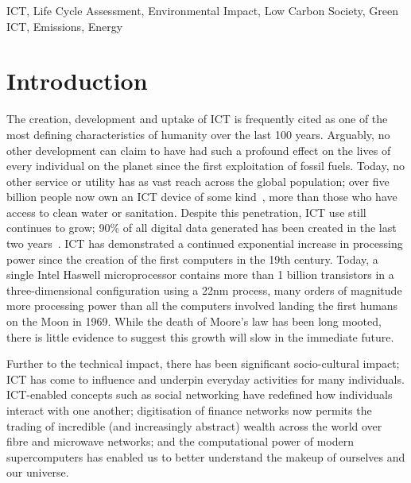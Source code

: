 \documentclass[conference]{IEEEtran}
\begin{document}
%

\begin{IEEEkeywords}
ICT, Life Cycle Assessment, Environmental Impact, Low Carbon Society,
Green ICT, Emissions, Energy
\end{IEEEkeywords}


\section{Introduction}

The creation, development and uptake of ICT is frequently cited as one
of the most defining characteristics of humanity over the last 100
years. Arguably, no other development can claim to have had such a
profound effect on the lives of every individual on the planet since
the first exploitation of fossil fuels. Today, no other service or
utility has as vast reach across the global population; over five
billion people now own an ICT device of some
kind~\cite{arup-et-al:2011}, more than those who have access to clean
water or sanitation. Despite this penetration, ICT use still continues
to grow; 90\% of all digital data generated has been created in the
last two years~\cite{bbcnews:2012}. ICT has demonstrated a continued
exponential increase in processing power since the creation of the
first computers in the 19th century. Today, a single Intel Haswell
microprocessor contains more than 1 billion transistors in a
three-dimensional configuration using a 22nm process, many orders of
magnitude more processing power than all the computers involved
landing the first humans on the Moon in 1969. While the death of
Moore's law has been long mooted, there is little evidence to suggest
this growth will slow in the immediate future.

Further to the technical impact, there has been significant
socio-cultural impact; ICT has come to influence and underpin everyday
activities for many individuals. ICT-enabled concepts such as social
networking have redefined how individuals interact with one another;
digitisation of finance networks now permits the trading of incredible
(and increasingly abstract) wealth across the world over fibre and
microwave networks; and the computational power of modern
supercomputers has enabled us to better understand the makeup of
ourselves and our universe.
\end{document}
